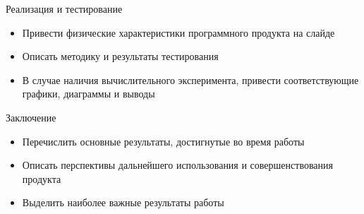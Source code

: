 \documentclass{../cls/fefu_presentation}
\begin{document}
    \note{}
    
    \begin{frame}{Реализация и тестирование}
        \begin{block}{}
            \begin{itemize}
                \item Привести физические характеристики программного продукта на слайде
                \item Описать методику и результаты тестирования
                \item В случае наличия вычислительного эксперимента, привести соответствующие графики, диаграммы и выводы
            \end{itemize}
        \end{block}
    \end{frame}


    \begin{frame}{Заключение}
        \begin{block}{}
            \begin{itemize}
                \item Перечислить основные результаты, достигнутые во время работы
                \item Описать перспективы дальнейшего использования и совершенствования продукта
                \item Выделить наиболее важные результаты работы
            \end{itemize}
        \end{block}
    \end{frame}

    
\end{document}
